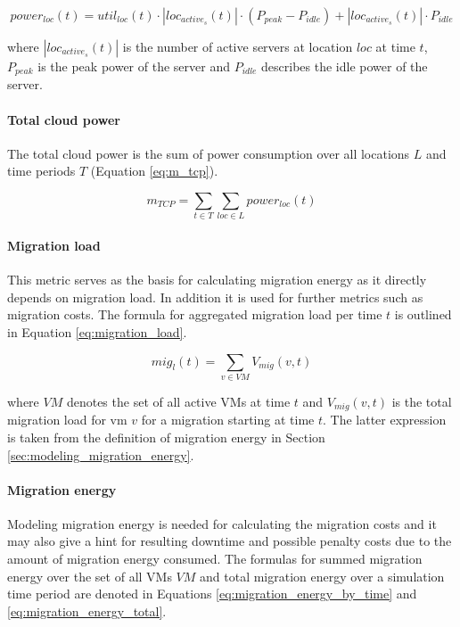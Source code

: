\begin{equation}
	power_{loc}(t) = util_{loc}(t) \cdot |loc_{active_s}(t)| \cdot (P_{peak} - P_{idle}) + |loc_{active_s}(t)| \cdot P_{idle}
\label{eq:power_loc}
\end{equation}

where $|loc_{active_s}(t)|$ is the number of active servers at location $loc$ at time $t$, $P_{peak}$ is the peak power of the server and $P_{idle}$ describes the idle power of the server. 

\paragraph{Total cloud power}

The total cloud power is the sum of power consumption over all locations $L$ and time periods $T$ (Equation \ref{eq:m_tcp}). 

\begin{equation}
	m_{TCP} = \sum_{t \in T} \sum_{loc \in L} power_{loc}(t)
\label{eq:m_tcp}
\end{equation}


\paragraph{Migration load}
This metric serves as the basis for calculating migration energy as it directly depends on migration load. In addition it is used for further metrics such as migration costs. The formula for aggregated migration load per time $t$ is outlined in Equation \ref{eq:migration_load}.

\begin{equation}
	mig_l(t) = \sum_{v \in VM} V_{mig}(v,t)
\label{eq:migration_load}
\end{equation}

where $VM$ denotes the set of all active VMs at time $t$ and $V_{mig}(v,t)$ is the total migration load for vm $v$ for a migration starting at time $t$. The latter expression is taken from the definition of migration energy in Section \ref{sec:modeling_migration_energy}. 

\paragraph{Migration energy}
Modeling migration energy is needed for calculating the migration costs and it may also give a hint for resulting downtime and possible penalty costs due to the amount of migration energy consumed. 
The formulas for summed migration energy over the set of all VMs $VM$ and total migration energy over a simulation time period are denoted in Equations \ref{eq:migration_energy_by_time} and \ref{eq:migration_energy_total}. 

